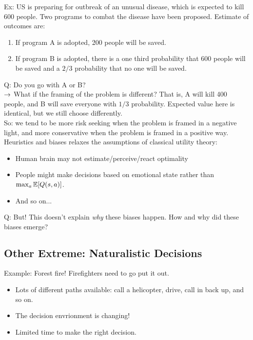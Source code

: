 Ex: US is preparing for outbreak of an unusual disease, which is expected to kill 600 people. Two programs to combat the disease have been proposed. Estimate of outcomes are:
\begin{enumerate}[A]
    \item If program A is adopted, 200 people will be saved.
    \item If program B is adopted, there is a one third probability that 600 people will be saved and a $2/3$ probability that no one will be saved.
\end{enumerate}
Q: Do you go with A or B? \\

$\rightarrow$ What if the framing of the problem is different? That is, A will kill 400 people, and B will save everyone with $1/3$ probability. Expected value here is identical, but we still choose differently. \\

So: we tend to be more risk seeking when the problem is framed in a negative light, and more conservative when the problem is framed in a positive way. \\

Heuristics and biases relaxes the assumptions of classical utility theory:
\begin{itemize}
    \item Human brain may not estimate/perceive/react optimality
    \item People might make decisions based on emotional state rather than $\max_a \mathbb{E}[Q(s,a)]$.
    \item And so on...
\end{itemize}

Q: But! This doesn't explain {\it why} these biases happen. How and why did these biases emerge? \\

\subsection{Other Extreme: Naturalistic Decisions~\cite{salas2001linking}}

Example: Forest fire! Firefighters need to go put it out.
\begin{itemize}
    \item Lots of different paths available: call a helicopter, drive, call in back up, and so on.
    \item The decision envrionment is changing!
    \item Limited time to make the right decision.
\end{itemize}

